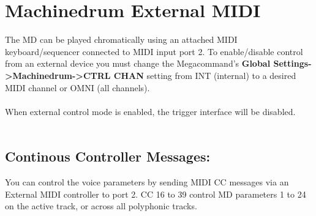 \section{Machinedrum External MIDI}
The MD can be played chromatically using an attached MIDI keyboard/sequencer connected to MIDI input port 2.
To enable/disable control from an external device you must change the Megacommand's \textbf{Global Settings->Machinedrum->CTRL CHAN} setting from INT (internal) to a desired MIDI channel or OMNI (all channels).\\
\\
When external control mode is enabled, the trigger interface will be disabled.\\\\
\subsection{Continous Controller Messages:}
You can control the voice parameters by sending MIDI CC messages via an External MIDI controller to port 2. CC 16 to 39 control MD parameters 1 to 24 on the active track, or across all polyphonic tracks.

